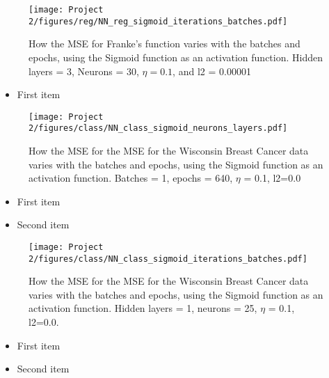 \documentclass[english,notitlepage,reprint,nofootinbib]{revtex4-2}  %
\begin{document}
\begin{figure}[h!]
    \centering %
    \texttt{[image: Project 2/figures/reg/NN\_reg\_sigmoid\_iterations\_batches.pdf]} 
    \caption{How the MSE for Franke's function varies with the batches and epochs, using the Sigmoid function as an activation function. 
    Hidden layers = 3, Neurons = 30, $\eta=0.1$, and l2 = 0.00001}
    \label{fig: b_sigmoid_2}
\end{figure}

\begin{itemize}
\color{white}
\item First item
\end{itemize}

\begin{figure}[h!]
    \centering %
    \texttt{[image: Project 2/figures/class/NN\_class\_sigmoid\_neurons\_layers.pdf]} 
    \caption{How the MSE for the MSE for the Wisconsin Breast Cancer data varies with the batches and epochs, using the Sigmoid function as an activation function. Batches = 1, epochs = 640, $\eta$ = 0.1, l2=0.0
    }
    \label{fig: nn_neuron_layer}
\end{figure}


\begin{itemize}
\color{white}
\item First item
\item Second item
\end{itemize}

\begin{figure}[h!]
    \centering %
    \texttt{[image: Project 2/figures/class/NN\_class\_sigmoid\_iterations\_batches.pdf]} 
    \caption{How the MSE for the MSE for the Wisconsin Breast Cancer data varies with the batches and epochs, using the Sigmoid function as an activation function. Hidden layers = 1, neurons = 25, $\eta$ = 0.1, l2=0.0. 
    }
    \label{fig: nn_iter_batch}
\end{figure}


\begin{itemize}
\color{white}
\item First item
\item Second item
\end{itemize}














\onecolumngrid
%
\end{document}
